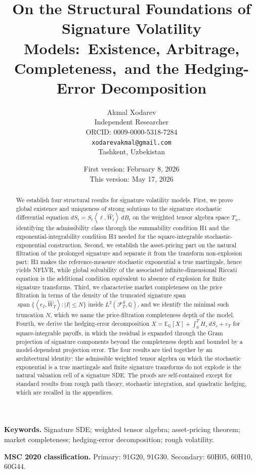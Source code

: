 \documentclass[11pt,oneside]{article}
\title{On the Structural Foundations of Signature Volatility Models:\
Existence, Arbitrage, Completeness,\
and the Hedging-Error Decomposition}
\author{Akmal Xodarev\\
Independent Researcher\\
ORCID: 0009-0000-5318-7284\\
\texttt{xodarevakmal@gmail.com}\\
Tashkent, Uzbekistan}
\date{First version: February 8, 2026\\This version: May 17, 2026}
\theoremstyle{plain}
\theoremstyle{definition}
\theoremstyle{remark}
\newcommand{\E}{\mathbb{E}}
\newcommand{\Q}{\mathbb{Q}}
\newcommand{\Tw}{T_w}
\newcommand{\cW}{\widehat W}
\newcommand{\FS}{\mathcal F^S}
\newcommand{\inner}[2]{\left\langle #1,#2\right\rangle}
\newcommand{\Span}{\operatorname{span}}
\begin{document}
\maketitle
\thispagestyle{empty}
\clearpage

\begin{abstract}
We establish four structural results for signature volatility models. First, we prove global existence and uniqueness of strong solutions to the signature stochastic differential equation $dS_t=S_t\inner{\ell}{\cW_t}\,dB_t$ on the weighted tensor algebra space $\Tw$, identifying the admissibility class through the summability condition H1 and the exponential-integrability condition H3 needed for the square-integrable stochastic-exponential construction. Second, we establish the asset-pricing part on the natural filtration of the prolonged signature and separate it from the transform non-explosion part: H3 makes the reference-measure stochastic exponential a true martingale, hence yields NFLVR, while global solvability of the associated infinite-dimensional Riccati equation is the additional condition equivalent to absence of explosion for finite signature transforms. Third, we characterise market completeness on the price filtration in terms of the density of the truncated signature span $\Span\{\inner{e_I}{\cW_T}: |I|\leq N\}$ inside $L^2(\FS_T,\Q)$, and we identify the minimal such truncation $N$, which we name the price-filtration completeness depth of the model. Fourth, we derive the hedging-error decomposition $X=\E_\Q[X]+\int_0^T H_s\,dS_s+\varepsilon_T$ for square-integrable payoffs, in which the residual is expanded through the Gram projection of signature components beyond the completeness depth and bounded by a model-dependent projection error. The four results are tied together by an architectural identity: the admissible weighted tensor algebra on which the stochastic exponential is a true martingale and finite signature transforms do not explode is the natural valuation cell of a signature SDE. The proofs are self-contained except for standard results from rough path theory, stochastic integration, and quadratic hedging, which are recalled in the appendices.
\end{abstract}

\noindent\textbf{Keywords.} Signature SDE; weighted tensor algebra; asset-pricing theorem; market completeness; hedging-error decomposition; rough volatility.

\medskip
\noindent\textbf{MSC 2020 classification.} Primary: 91G20, 91G30. Secondary: 60H05, 60H10, 60G44.
\end{document}
